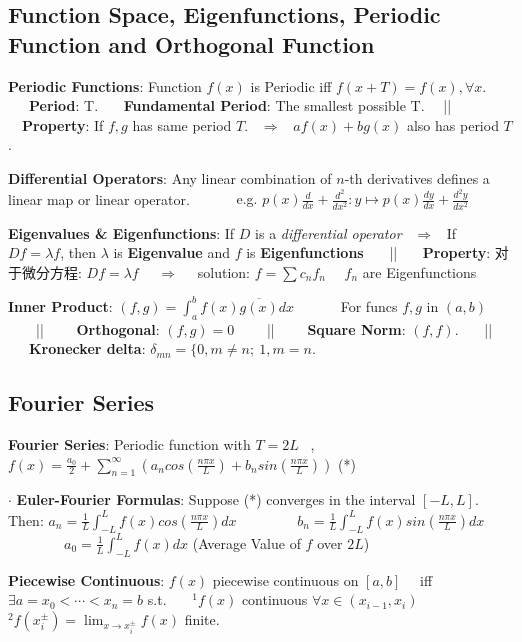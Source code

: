 \documentclass[8pt]{extarticle}
\begin{document}
\subsection{Function Space, Eigenfunctions, Periodic Function and Orthogonal Function}

\textbf{Periodic Functions}: Function $f(x)$ is Periodic iff $f(x+T)=f(x),\forall x$. \ \ \ \textbf{Period}: T. \ \ \ \textbf{Fundamental Period}: The smallest possible T. \ \ || \ \ \textbf{Property}: If $f,g$ has same period $T$. \ $\Rightarrow$ \ $af(x)+bg(x)$ also has period $T$.

\textbf{Differential Operators}: Any linear combination of $n$-th derivatives defines a linear map or linear operator. \ \ \ \ \ \ {\tiny e.g. $p(x)\frac{d}{dx}+\frac{d^2}{dx^2}:y\mapsto p(x)\frac{dy}{dx}+\frac{d^2y}{dx^2}$}

\textbf{Eigenvalues \& Eigenfunctions}: If $D$ is a \textit{differential operator} \ $\Rightarrow$ \ If $Df=\lambda f$, then $\lambda$ is \textbf{Eigenvalue} and $f$ is \textbf{Eigenfunctions} \ \ \ || \ \ \ \textbf{Property}: {\tiny 对于微分方程}: $Df=\lambda f$ \ \ $\Rightarrow$ \ \ solution: $f=\sum c_nf_n$ \ \ $f_n$ are Eigenfunctions

\textbf{Inner Product}: $(f,g) =\int^b_{a}f(x)\overline{g(x)}dx$ \ \ \ \ \ \ For funcs $f,g$ in $(a,b)$ \ \ \ \ || \ \ \ \ \textbf{Orthogonal}: $(f,g)=0$ \ \ \ \ || \ \ \ \ \textbf{Square Norm}: $(f,f)$. \ \ \ || \ \ \ \textbf{Kronecker delta}: $\delta_{mn}=\{0,m\ne n; \ 1,m=n.$


\subsection{Fourier Series}

\textbf{Fourier Series}: Periodic function with $T=2L$ \ , \ $f(x)=\frac{a_0}{2}+\sum_{n=1}^{\infty}\left(a_ncos(\frac{n\pi x}{L})+b_nsin(\frac{n\pi x}{L})\right)$ (*)

$\cdot$ \textbf{Euler-Fourier Formulas}: Suppose (*) converges in the interval $[-L,L]$. Then: $a_n=\frac{1}{L}\int^L_{-L}f(x)cos(\frac{n\pi x}{L})dx$ \ \ \ \ \ \ \ \ $b_n=\frac{1}{L}\int^L_{-L}f(x)sin(\frac{n\pi x}{L})dx$ \ \ \ \ \ \ \ \ $a_0=\frac{1}{L}\int^L_{-L}f(x)dx$ {\scriptsize (Average Value of $f$ over $2L$)}

\vspace{2pt}
\textbf{Piecewise Continuous}: { $f(x)$ piecewise continuous on $[a,b]$ \ \ iff \ \ $\exists a=x_0<\cdots<x_n=b$ s.t. \ \ \ $^1f(x)$ continuous $\forall x\in(x_{i-1},x_i)$ \ \ \ $^2 f(x_i^{\pm})=\lim_{x\to x_i^{\pm}}f(x)$ finite.}
\end{document}
